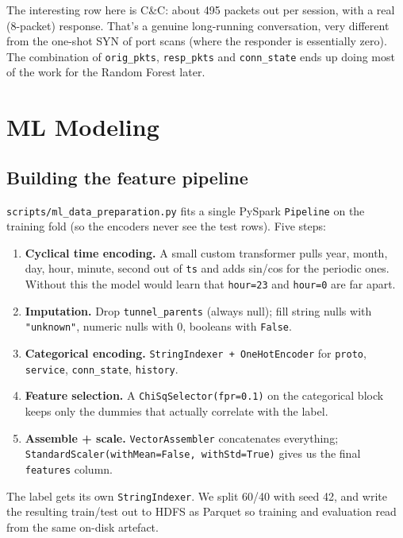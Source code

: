 \documentclass[11pt,a4paper]{article}
\begin{document}
The interesting row here is C\&C: about 495 packets out per session, with
a real (8-packet) response. That's a genuine long-running conversation,
very different from the one-shot SYN of port scans (where the responder
is essentially zero). The combination of \texttt{orig\_pkts},
\texttt{resp\_pkts} and \texttt{conn\_state} ends up doing most of the
work for the Random Forest later.

\section{ML Modeling}

\subsection{Building the feature pipeline}

\texttt{scripts/ml\_data\_preparation.py} fits a single PySpark
\texttt{Pipeline} on the training fold (so the encoders never see the
test rows). Five steps:

\begin{enumerate}[leftmargin=2em]
    \item \textbf{Cyclical time encoding.} A small custom transformer pulls
    year, month, day, hour, minute, second out of \texttt{ts} and adds
    sin/cos for the periodic ones. Without this the model would learn that
    \texttt{hour=23} and \texttt{hour=0} are far apart.
    \item \textbf{Imputation.} Drop \texttt{tunnel\_parents} (always null);
    fill string nulls with \texttt{"unknown"}, numeric nulls with 0,
    booleans with \texttt{False}.
    \item \textbf{Categorical encoding.} \texttt{StringIndexer +
    OneHotEncoder} for \texttt{proto}, \texttt{service}, \texttt{conn\_state},
    \texttt{history}.
    \item \textbf{Feature selection.} A \texttt{ChiSqSelector(fpr=0.1)} on
    the categorical block keeps only the dummies that actually correlate
    with the label.
    \item \textbf{Assemble + scale.} \texttt{VectorAssembler} concatenates
    everything; \texttt{StandardScaler(withMean=False, withStd=True)} gives
    us the final \texttt{features} column.
\end{enumerate}

The label gets its own \texttt{StringIndexer}. We split 60/40 with
seed 42, and write the resulting train/test out to HDFS as Parquet so
training and evaluation read from the same on-disk artefact.
\end{document}
